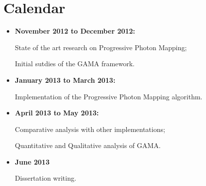 \section{Calendar}

\begin{itemize}
  \item \textbf{November 2012 to December 2012:}

    \sudoindent State of the art research on Progressive Photon Mapping;

    \sudoindent Initial sutdies of the GAMA framework.


  \item \textbf{January 2013 to March 2013:}

    \sudoindent Implementation of the Progressive Photon Mapping algorithm.


  \item \textbf{April 2013 to May 2013:}

    \sudoindent  Comparative analysis with other implementations;

    \sudoindent Quantitative and Qualitative analysis of GAMA.


  \item \textbf{June 2013}

      \sudoindent Dissertation writing.
\end{itemize}
